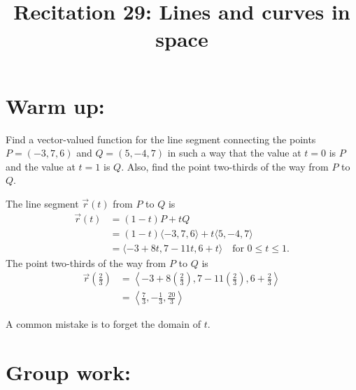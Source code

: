 \documentclass[]{ximera}
\title{Recitation 29: Lines and curves in space}
\begin{document}
\begin{abstract}		\end{abstract}
\maketitle



\section{Warm up:}
Find a vector-valued function for the line segment connecting the points $P = (-3,7,6)$ and $Q = (5,-4,7)$ in such a way that the value at $t=0$ is $P$ and the value at $t=1$ is $Q$.  
Also, find the point two-thirds of the way from $P$ to $Q$.
	\begin{freeResponse}
	The line segment $\vec{r}(t)$ from $P$ to $Q$ is 
		\begin{align*}
		\vec{r}(t) &= (1-t)P + tQ  \\
		&= (1-t) \langle -3,7,6 \rangle + t \langle 5,-4,7 \rangle  \\
		&= \boxed{\langle -3 + 8t, 7 - 11t, 6 + t \rangle \quad \text{for }0 \leq t \leq 1}.
		\end{align*}
	The point two-thirds of the way from $P$ to $Q$ is
		\begin{align*}
		\vec{r} \left( \frac{2}{3} \right)
		&= \left\langle -3 + 8 \left( \frac{2}{3} \right), 7 - 11\left( \frac{2}{3} \right), 6 + \frac{2}{3} \right\rangle  \\
		&= \boxed{\left\langle \frac{7}{3} , - \frac{1}{3}, \frac{20}{3} \right\rangle}
		\end{align*}
	\end{freeResponse}
	
\begin{instructorNotes}
A common mistake is to forget the domain of $t$. 
\end{instructorNotes}







\section{Group work:}
\end{document}
